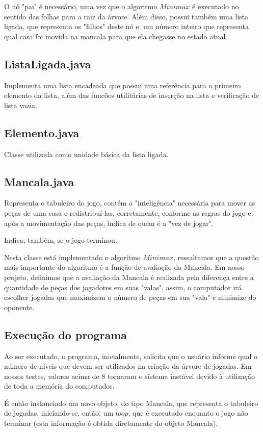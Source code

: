 \documentclass[a4paper,11pt]{article}
\begin{document}
O nó "pai" é necessário, uma vez que o algoritmo $Minimax$ é executado no sentido das folhas para a raiz da árvore. Além disso, possui também uma lista ligada, que representa os "filhos" deste nó e, um número inteiro que representa qual casa foi movida na mancala para que ela chegasse no estado atual.

\subsection{ListaLigada.java}
Implementa uma lista encadeada que possui uma referência para o primeiro elemento da lista, além das funcões utilitárias de inserção na lista e verificação de lista vazia.

\subsection{Elemento.java}
Classe utilizada como unidade básica da lista ligada.

\subsection{Mancala.java}
Representa o tabuleiro do jogo, contém a "inteligência" necessária para mover as peças de uma casa e redistribuí-las, corretamente, conforme as regras do jogo e, após a movimentação das peças, indica de quem é a "vez de jogar". 

Indica, também, se o jogo terminou. 

Nesta classe está implementado o algoritmo $Minimax$, ressaltamos que a questão mais importante do algoritmo é a função de avaliação da Mancala. Em nosso projeto, definimos que a avaliação da Mancala é realizada pela diferença entre a quantidade de peças dos jogadores em suas "valas", assim, o computador irá escolher jogadas que maximizem o número de peças em sua "vala" e minimize do oponente.

\subsection{Execução do programa}
Ao ser executado, o programa, inicialmente, solicita que o usuário informe qual o número de níveis que devem ser utilizados na criação da árvore de jogadas. Em nossos testes, valores acima de 8 tornaram o sistema instável devido à utilização de toda a memória do computador.

É então instanciado um novo objeto, do tipo Mancala, que representa o tabuleiro de jogadas, iniciando-se, então, um $loop$, que é executado enquanto o jogo não terminar (esta informação é obtida diretamente do objeto Mancala).
\end{document}
